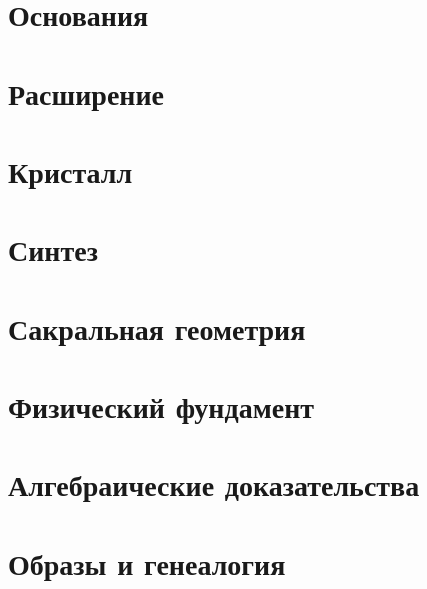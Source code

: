 \documentclass[12pt,a4paper,openany,oneside]{book}
\theoremstyle{plain}
\theoremstyle{definition}
\theoremstyle{remark}
\begin{document}
\mainmatter

\part{Основания}





\part{Расширение}





\part{Кристалл}



\part{Синтез}


\part{Сакральная геометрия}










\part{Физический фундамент}






\part{Алгебраические доказательства}






\part{Образы и генеалогия}




\end{document}
